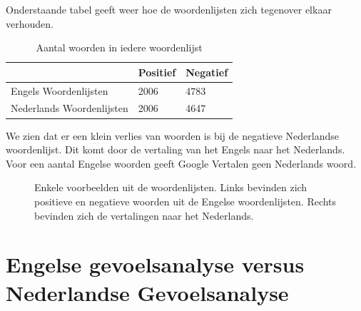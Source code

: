 Onderstaande tabel geeft weer hoe de woordenlijsten zich tegenover elkaar verhouden.

\begin{table}[h]
\centering
\begin{tabular}{l|l|l|}
\cline{2-3}
 & Positief & Negatief \\ \hline
\multicolumn{1}{|l|}{Engels Woordenlijsten}     & 2006     & 4783     \\ \hline
\multicolumn{1}{|l|}{Nederlands Woordenlijsten} & 2006     & 4647     \\ \hline
\end{tabular}
\caption{Aantal woorden in iedere woordenlijst}
\label{table: Verlies in woordenschat}
\end{table}

We zien dat er een klein verlies van woorden is bij de negatieve Nederlandse woordenlijst. Dit komt door de vertaling van het Engels naar het Nederlands. Voor een aantal Engelse woorden geeft Google Vertalen geen Nederlands woord. 

\begin{figure}%
    \centering
    \caption{Enkele voorbeelden uit de woordenlijsten. Links bevinden zich positieve en negatieve woorden uit de Engelse woordenlijsten. Rechts bevinden zich de vertalingen naar het Nederlands.}
    \label{vbwoordenlijsten}
\end{figure}

\section{Engelse gevoelsanalyse versus Nederlandse Gevoelsanalyse}\label{Engelse gevoelsanalyse versus Nederlandse Gevoelsanalyse}

